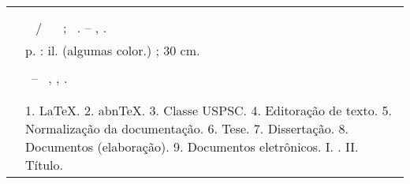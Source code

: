 %
\begin{fichacatalografica}
	\hspace{-1.4cm}
	\imprimirnotaautorizacao \\ \\
	\vspace*{\fill}					%
	\begin{center}					%
		\imprimirnotabib \\
\begin{table}[htb]
	\scriptsize
	\centering	
	\begin{tabular}{|p{0.9cm} p{8.7cm}|}
		\hline
	      & \\
		  &	  \imprimirautorficha     \\
		
		 \imprimircutter & 
							\hspace{0.4cm}\imprimirtitulo~  / ~\imprimirautor~ ;  ~\imprimirorientadorcorpoficha. -- 	\imprimirlocal, \imprimirdata.   \\
		
		  &  %
		
			\hspace{0.4cm}\pageref{LastPage} p. : il. (algumas color.) ; 30 cm.\\ 
		  & \\
		  & 
		    \hspace{0.4cm}\imprimirnotaficha ~--~ 
						  \imprimirunidademin, 
						  \imprimiruniversidademin, 
		                  \imprimirdata. \\ 
		  & \\                 
		  & \\ 
		  & \hspace{0.4cm}1. LaTeX. 2. abnTeX. 3. Classe USPSC. 4. Editoração de texto. 5. Normalização da documentação. 6. Tese. 7. Dissertação. 8. Documentos (elaboração). 9. Documentos eletrônicos. I. \imprimirorientadorficha. 
		   II. Título. \\
	

\end{tabular}
\end{table}
\end{center}
\end{fichacatalografica}

